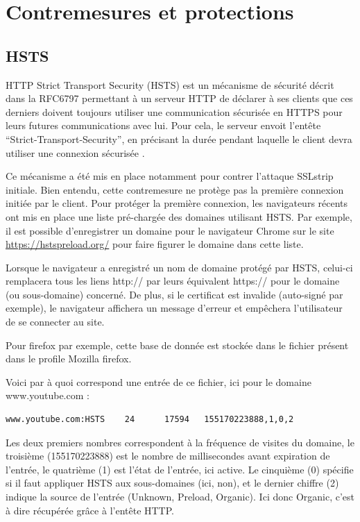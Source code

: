 \section{Contremesures et protections}

\subsection{HSTS}

\label{sec:hsts}

HTTP Strict Transport Security (HSTS) est un mécanisme de sécurité décrit dans la RFC6797 permettant à un serveur HTTP de déclarer à ses clients que ces derniers doivent toujours utiliser une communication sécurisée en HTTPS pour leurs futures communications avec lui. Pour cela, le serveur envoit l'entête ``Strict-Transport-Security'', en précisant la durée pendant laquelle le client devra utiliser une connexion sécurisée \cite{hsts}.

Ce mécanisme a été mis en place notamment pour contrer l'attaque SSLstrip initiale. Bien entendu, cette contremesure ne protège pas la première connexion initiée par le client. Pour protéger la première connexion, les navigateurs récents ont mis en place une liste pré-chargée des domaines utilisant HSTS. Par exemple, il est possible d'enregistrer un domaine pour le navigateur Chrome sur le site \url{https://hstspreload.org/} pour faire figurer le domaine dans cette liste.

Lorsque le navigateur a enregistré un nom de domaine protégé par HSTS, celui-ci remplacera tous les liens http:// par leurs équivalent https:// pour le domaine (ou sous-domaine) concerné. De plus, si le certificat est invalide (auto-signé par exemple), le navigateur affichera un message d'erreur et empêchera l'utilisateur de se connecter au site.

Pour firefox par exemple, cette base de donnée est stockée dans le fichier  présent dans le profile Mozilla firefox.

Voici par à quoi correspond une entrée de ce fichier, ici pour le domaine www.youtube.com :

\begin{verbatim}
www.youtube.com:HSTS    24      17594   155170223888,1,0,2
\end{verbatim}

Les deux premiers nombres correspondent à la fréquence de visites du domaine, le troisième (155170223888) est le nombre de millisecondes avant expiration de l'entrée, le quatrième (1) est l'état de l'entrée, ici active. Le cinquième (0) spécifie si il faut appliquer HSTS aux sous-domaines (ici, non), et le dernier chiffre (2) indique la source de l'entrée (Unknown, Preload, Organic). Ici donc Organic, c'est à dire récupérée grâce à l'entête HTTP.

